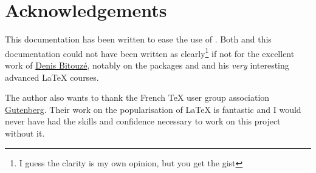 \section*{Acknowledgements}
\label{sec:aknowledgments}

This documentation has been written to ease the use of . %
Both \lqt{} and this documentation could not have been written as
clearly\footnote{I guess the clarity is my own opinion, but you get the gist} if
not for the excellent work of \href{https://ctan.org/author/bitouze}{Denis
  Bitouzé}, notably on the packages  and  and
his \emph{very} interesting advanced \LaTeX{} courses. %

The author also wants to thank the French \TeX{} user group association
\href{https://www.gutenberg-asso.fr/}{\sffamily Gutenberg}. %
Their work on the popularisation of \LaTeX{} is fantastic and I would never
have had the skills and confidence necessary to work on this project
without it. %

